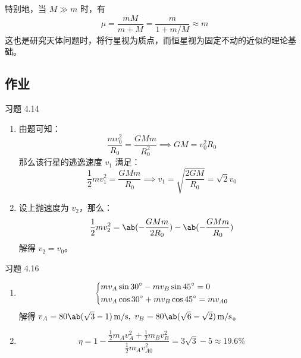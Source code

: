特别地，当 $M \gg m$ 时，有
$$
\mu = \frac{mM}{m + M} = \frac{m}{1 + m/M} \approx m
$$
这也是研究天体问题时，将行星视为质点，而恒星视为固定不动的近似的理论基础。

\subsection{作业}

\begin{problem}
    习题 4.14
    \begin{solution}
        \begin{enumerate}
            \item[\textbf{1)}] 由题可知：
            $$
            \frac{m v_0^2}{R_0} = \frac{G M m}{R_0^2} \implies GM = v_0^2 R_0
            $$
            那么该行星的逃逸速度 $v_1$ 满足：
            $$
            \frac{1}{2} m v_1^2 = \frac{G M m}{R_0} \implies v_1 = \sqrt{\frac{2 G M}{R_0}} = \sqrt{2} v_0
            $$
            \item[\textbf{2)}] 设上抛速度为 $v_2$，那么：
            $$
            \frac{1}{2} m v_2^2 = \ab(-\frac{G M m}{2 R_0}) - \ab(-\frac{G M m}{R_0})
            $$
            解得 $v_2 = v_0$。
        \end{enumerate}
    \end{solution}
\end{problem}

\begin{problem}
    习题 4.16
    \begin{solution}
        \begin{enumerate}
            \item[\textbf{1)}]
            $$
            \begin{dcases}
                m v_A \sin 30^\circ - m v_B \sin 45^\circ = 0 \\
                m v_A \cos 30^\circ + m v_B \cos 45^\circ = m v_{A0}
            \end{dcases}
            $$
            解得 $v_A = 80\ab(\sqrt{3} - 1)\,\mathrm{m / s},\ v_B = 80\ab(\sqrt{6} - \sqrt{2})\,\mathrm{m / s}$。

            \item[\textbf{2)}]
            $$
            \eta = 1 - \frac{\frac{1}{2} m_A v_A^2 + \frac{1}{2} m_B v_B^2}{\frac{1}{2} m_A v_{A0}^2} = 3 \sqrt{3} - 5 \approx 19.6\%
            $$
        \end{enumerate}
    \end{solution}
\end{problem}

